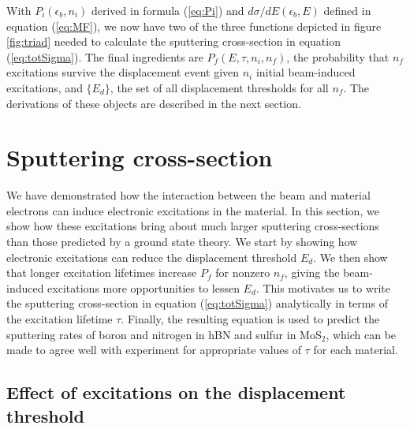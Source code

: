 \documentclass{article}
\begin{document}
With $P_i(\epsilon_b, n_i)$ derived in formula (\ref{eq:Pi}) and
$d\sigma/dE(\epsilon_b, E)$ defined in equation (\ref{eq:MF}), we now have two
of the three functions depicted in figure \ref{fig:triad} needed to calculate
the sputtering cross-section in equation (\ref{eq:totSigma}).
The final ingredients are $P_f(E, \tau, n_i, n_f)$, the probability that $n_f$
excitations survive the displacement event given $n_i$ initial beam-induced
excitations, and $\{E_d\}$, the set of all displacement thresholds for all
$n_f$.
The derivations of these objects are described in the next section.

\section{Sputtering cross-section}
\label{sec:sputtering}

We have demonstrated how the interaction between the beam and material
electrons can induce electronic excitations in the material.
In this section, we show how these excitations bring about much larger
sputtering cross-sections than those predicted by a ground state theory.
We start by showing how electronic excitations can reduce the displacement
threshold $E_d$.
We then show that longer excitation lifetimes increase $P_f$ for nonzero $n_f$,
giving the beam-induced excitations more opportunities to lessen $E_d$.
This motivates us to write the sputtering cross-section in equation
(\ref{eq:totSigma}) analytically in terms of the excitation lifetime $\tau$.
Finally, the resulting equation is used to predict the sputtering rates of
boron and nitrogen in hBN and sulfur in MoS$_2$, which can be made to agree
well with experiment for appropriate values of $\tau$ for each material.

\subsection{Effect of excitations on the displacement threshold}
\label{sec:assumptions}
\end{document}
